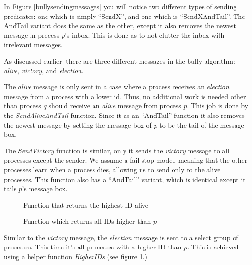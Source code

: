 \documentclass{report}
\begin{document}
In Figure \ref{bullysendingmessages} you will notice two different types of sending predicates: one which is simply ``SendX'', and one which is ``SendXAndTail''. The AndTail variant does the same as the other, except it also removes the newest message in process $p$'s inbox. This is done as to not clutter the inbox with irrelevant messages.

As discussed earlier, there are three different messages in the bully algorithm: \textit{alive}, \textit{victory}, and \textit{election}.

The \textit{alive} message is only sent in a case where a process receives an \textit{election} message from a process with a lower id. Thus, no additional work is needed other than process $q$ should receive an \textit{alive} message from process $p$. This job is done by the \textit{SendAliveAndTail} function. Since it as an ``AndTail'' function it also removes the newest message by setting the message box of $p$ to be the tail of the message box.

The \textit{SendVictory} function is similar, only it sends the \textit{victory} message to all processes except the sender. We assume a fail-stop model, meaning that the other processes learn when a process dies, allowing us to send only to the alive processes. This function also has a ``AndTail'' variant, which is identical except it tails $p$'s message box.

\begin{figure}

\tlatex
\@x{}\moduleLeftDash{}\moduleRightDash\@xx{}%
\@xx{}%
%
%
\fl{}\bottombar\cl{}

  \caption{Function that returns the highest ID alive}
  \end{figure}

\begin{figure}
  \tlatex

\@x{}\moduleLeftDash{}\moduleRightDash\@xx{}%
\fl{}\bottombar\cl{}
\label{higherids}
  \caption{Function which returns all IDs higher than $p$}
\end{figure}

Similar to the \textit{victory} message, the \textit{election} message is sent to a select group of processes. This time it's all processes with a higher ID than $p$. This is achieved using a helper function \textit{HigherIDs} (see figure \ref{higherids}.)
\end{document}
